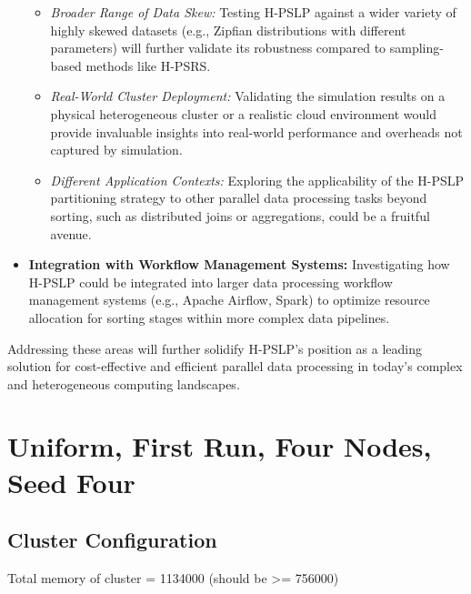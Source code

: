 \documentclass[]{interact}
\theoremstyle{plain}
\theoremstyle{definition}
\theoremstyle{remark}
\begin{document}
\begin{itemize}
\begin{itemize}
        \item \textit{Broader Range of Data Skew:} Testing H-PSLP against a wider variety of highly skewed datasets (e.g., Zipfian distributions with different parameters) will further validate its robustness compared to sampling-based methods like H-PSRS.
        \item \textit{Real-World Cluster Deployment:} Validating the simulation results on a physical heterogeneous cluster or a realistic cloud environment would provide invaluable insights into real-world performance and overheads not captured by simulation.
        \item \textit{Different Application Contexts:} Exploring the applicability of the H-PSLP partitioning strategy to other parallel data processing tasks beyond sorting, such as distributed joins or aggregations, could be a fruitful avenue.
    \end{itemize}
    \item \textbf{Integration with Workflow Management Systems:} Investigating how H-PSLP could be integrated into larger data processing workflow management systems (e.g., Apache Airflow, Spark) to optimize resource allocation for sorting stages within more complex data pipelines.
\end{itemize}
Addressing these areas will further solidify H-PSLP's position as a leading solution for cost-effective and efficient parallel data processing in today's complex and heterogeneous computing landscapes.









\appendix
\section{Uniform, First Run, Four Nodes, Seed Four}

\subsection{Cluster Configuration}
Total memory of cluster = 1134000 (should be >= 756000)
\end{document}
